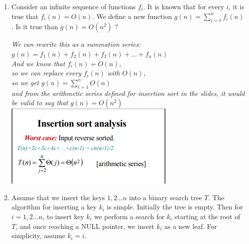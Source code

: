\documentclass[11pt,epic,leqno,eepic,psfig,]{article}
\newcommand{\ans}[1]{{\color{brown}{\bf\Large Answer:} \sl  #1 \color{black}}}
\renewcommand{\i}{\item}
\begin{document}
\renewcommand{\i}{\item}


 \everymath{\color{blue}}


\def\polylog{{{\sl polylog }}}
\def\poly{{{\sl poly }}}





\newpage







\begin{enumerate}



 


\i Consider an infinite sequence of functions $f_i$. It is known that for every $i$, it is true that $f_i (n)=O(n)$. We define a new function
$g(n)=\sum_{i=  1} ^n f_i(n)$. Is it true than $g(n)=O(n^2)$ ?

\ans{\Large We can rewrite this as a summation series: \\$g(n)=f_1(n) + f_2(n) + f_3(n) +... + f_n(n)$
\\And we know that $f_i (n)=O(n)$, \\so we can replace every  $f_i (n)$ with $O(n)$, \\so we get $g(n)=\sum_{i=  1} ^n O(n)$ \\and from the arithmetic series
defined for insertion sort in the slides, it would be valid to say that  $g(n)=O(n^2)$ }
 \\\includegraphics{insertionSort}

\i Assume that we insert the keys $1,2\dots n$ into a binary search tree $T$.
The algorithm for inserting a key $k_i$ is simple. Initially the tree is empty. Then for $i=1,2\dots n$,  to insert key $k_i$   we perform a search for $k_i$ starting  at the root of $T$,  %
and once reaching a NULL pointer, we insert $k_i$ as a new leaf. For simplicity, assume $k_i=i$.


\end{enumerate}
\end{document}
